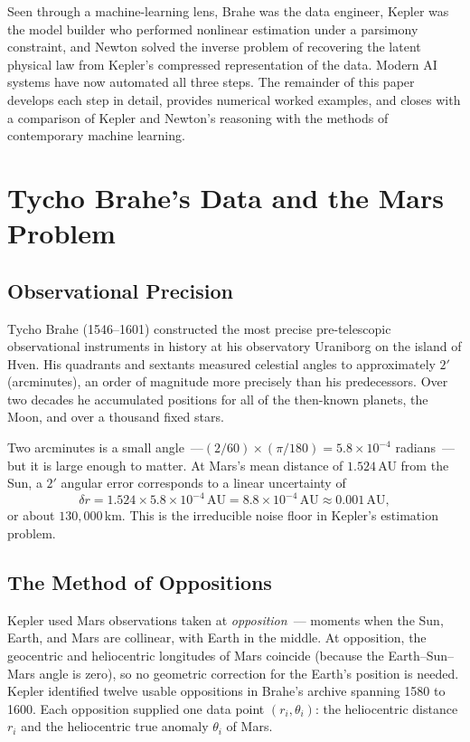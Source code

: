 \documentclass[12pt]{article}
\begin{document}
Seen through a machine-learning lens, Brahe was the data engineer,
Kepler was the model builder who performed nonlinear estimation under a
parsimony constraint, and Newton solved the inverse problem of recovering the
latent physical law from Kepler's compressed representation of the data.
Modern AI systems have now automated all three steps.
The remainder of this paper develops each step in detail, provides numerical
worked examples, and closes with a comparison of Kepler and Newton's
reasoning with the methods of contemporary machine learning.

\section{Tycho Brahe's Data and the Mars Problem}

\subsection{Observational Precision}

Tycho Brahe (1546--1601) constructed the most precise pre-telescopic
observational instruments in history at his observatory Uraniborg on the
island of Hven.  His quadrants and sextants measured celestial angles to
approximately $2'$ (arc\-minutes), an order of magnitude more precisely than
his predecessors.  Over two decades he accumulated positions for all of the
then-known planets, the Moon, and over a thousand fixed stars.

Two arc\-minutes is a small angle~---$(2/60)\times(\pi/180)=5.8\times10^{-4}$
radians~---but it is large enough to matter.
At Mars's mean distance of $1.524$\,AU from the Sun, a $2'$ angular error
corresponds to a linear uncertainty of
\[
   \delta r = 1.524 \times 5.8\times10^{-4}\,\text{AU}
            = 8.8\times10^{-4}\,\text{AU} \approx 0.001\,\text{AU},
\]
or about $130{,}000$\,km.  This is the irreducible noise floor in Kepler's
estimation problem.

\subsection{The Method of Oppositions}

Kepler used Mars observations taken at \emph{opposition}~---
moments when the Sun, Earth, and Mars are collinear, with Earth in
the middle.  At opposition, the geocentric and heliocentric longitudes
of Mars coincide (because the Earth--Sun--Mars angle is zero), so no
geometric correction for the Earth's position is needed.
Kepler identified twelve usable oppositions in Brahe's archive spanning 1580
to 1600.  Each opposition supplied one data point $(r_{i},\theta_{i})$:
the heliocentric distance $r_{i}$ and the heliocentric true anomaly
$\theta_{i}$ of Mars.
\end{document}
